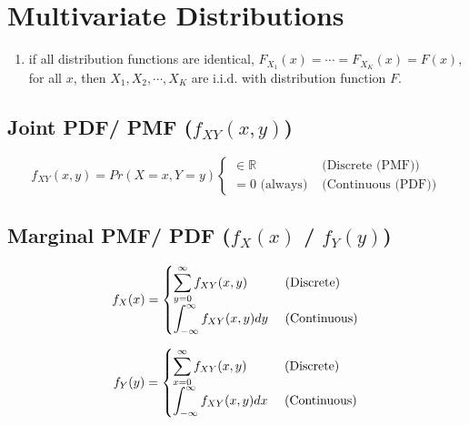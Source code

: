 \chapter{Multivariate Distributions \cite{ism-1,mfml-1}} \label{Multivariate Distributions}

\begin{enumerate}
     \item if all distribution functions are identical, $F_{X_1}(x)=\cdots=F_{X_K}(x)=F(x)$, for all $x$, then $X_1, X_2,\cdots,X_K$ are i.i.d. with distribution function $F$.
\end{enumerate}

\section{Joint PDF/ PMF ($f_{XY}(x, y)$) \cite{ism-1}}\label{Multivariate Distributions: Joint PDF/ PMF}

\[
    f_{XY}(x, y) 
    = Pr(X = x, Y = y)
    \begin{cases}
        \in \mathbb{R} & \text{ (Discrete (PMF))}\\
        = 0 \text{ (always)} & \text{ (Continuous (PDF))}
    \end{cases}
\]

\section{Marginal PMF/ PDF ($f_X(x)$ / $f_Y(y)$) \cite{ism-1,mfml-1}}\label{Multivariate Distributions: Marginal PMF/ PDF}

\begin{table}[H]
    \begin{minipage}{0.49\linewidth}
        \[
            f_X(x)
            = \begin{cases}
                \displaystyle\sum_{y=0}^\infty f_{XY}(x,y) & \text{ (Discrete)}\\[2ex]
                \displaystyle\int_{-\infty}^\infty f_{XY}(x,y) dy & \text{ (Continuous)}\\
            \end{cases}
        \]
    \end{minipage}
    \hfill
    \begin{minipage}{0.49\linewidth}
        \[
            f_Y(y)
            = \begin{cases}
                \displaystyle\sum_{x=0}^\infty f_{XY}(x,y) & \text{ (Discrete)}\\[2ex]
                \displaystyle\int_{-\infty}^\infty f_{XY}(x,y) dx & \text{ (Continuous)}\\
            \end{cases}
        \]
    \end{minipage}
\end{table}

